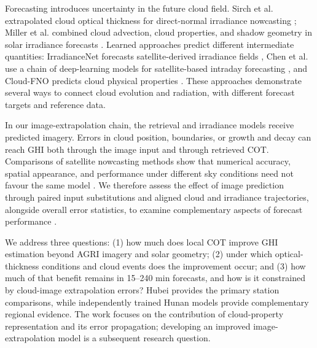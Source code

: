 \documentclass[11pt]{article}
\begin{document}
Forecasting introduces uncertainty in the future cloud field. Sirch et al. extrapolated cloud optical thickness for direct-normal irradiance nowcasting \cite{sirch2017}; Miller et al. combined cloud advection, cloud properties, and shadow geometry in solar irradiance forecasts \cite{miller2018}. Learned approaches predict different intermediate quantities: IrradianceNet forecasts satellite-derived irradiance fields \cite{nielsen2021}, Chen et al. use a chain of deep-learning models for satellite-based intraday forecasting \cite{chen2024}, and Cloud-FNO predicts cloud physical properties \cite{zhang2026}. These approaches demonstrate several ways to connect cloud evolution and radiation, with different forecast targets and reference data.

In our image-extrapolation chain, the retrieval and irradiance models receive predicted imagery. Errors in cloud position, boundaries, or growth and decay can reach GHI both through the image input and through retrieved COT. Comparisons of satellite nowcasting methods show that numerical accuracy, spatial appearance, and performance under different sky conditions need not favour the same model \cite{cui2024}. We therefore assess the effect of image prediction through paired input substitutions and aligned cloud and irradiance trajectories, alongside overall error statistics, to examine complementary aspects of forecast performance \cite{yang2020}.

We address three questions: (1) how much does local COT improve GHI estimation beyond AGRI imagery and solar geometry; (2) under which optical-thickness conditions and cloud events does the improvement occur; and (3) how much of that benefit remains in 15--240 min forecasts, and how is it constrained by cloud-image extrapolation errors? Hubei provides the primary station comparisons, while independently trained Hunan models provide complementary regional evidence. The work focuses on the contribution of cloud-property representation and its error propagation; developing an improved image-extrapolation model is a subsequent research question.
\end{document}
